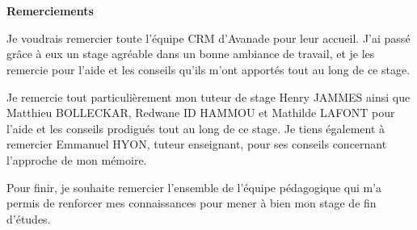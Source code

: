 \documentclass[a4paper,12pt,twoside,onecolumn,titlepage,french]{book}
\begin{document}

\cleardoublepage	

\cleardoublepage	

\chapter*{}				
$\ $
\vspace{5em}

\begin{center}
\textbf{\large{Remerciements}} 
\end{center}

	Je voudrais remercier toute l’équipe CRM d’Avanade pour leur accueil. J’ai passé grâce à eux un stage agréable dans un bonne ambiance de travail, et je les remercie pour l’aide et  les conseils qu’ils m’ont apportés tout au long de ce stage.
	\vspace{1em}
	
	Je remercie tout particulièrement mon tuteur de stage Henry JAMMES ainsi que Matthieu BOLLECKAR, Redwane ID HAMMOU et Mathilde LAFONT pour l’aide et les conseils prodigués tout au long de ce stage. Je tiens également à remercier Emmanuel HYON, tuteur enseignant, pour ses conseils concernant l’approche de mon mémoire.
	\vspace{1em}
	
	Pour finir, je souhaite remercier l’ensemble de l’équipe pédagogique qui m’a permis de renforcer mes connaissances pour mener à bien mon stage de fin d’études.
\cleardoublepage

\tableofcontents
\cleardoublepage

\cleardoublepage
{}
{}








\nocite{*}


\listoffigures
{}


\end{document}
